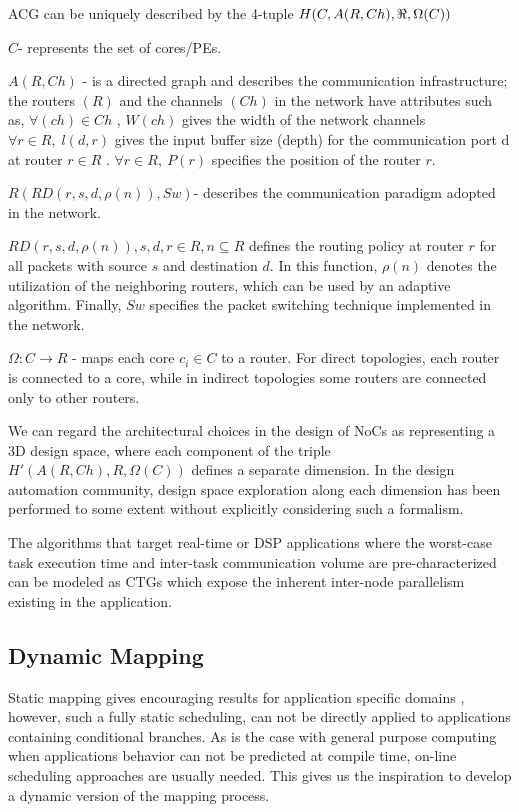 ACG can be uniquely described by the 4-tuple $\text{\ensuremath{H}}(C,A(R,Ch),\Re,\Omega(C))$

$C$- represents the set of cores/PEs.

$A(R,Ch)$ - is a directed graph and describes the communication infrastructure;
the routers $(R)$ and the channels $(Ch)$ in the network have attributes
such as, $\forall(ch)\in Ch$ , $W(ch)$ gives the width of the network
channels $\forall r\in R,\; l(d,r)$ gives the input buffer size (depth)
for the communication port d at router $r\in R$ . $\forall r\in R,\: P(r)$
specifies the position of the router $r$. 

$R(RD(r,s,d,\rho(n)),Sw)$- describes the communication paradigm adopted
in the network. 

$RD(r,s,d,\rho(n)),s,d,r\in R,n\subseteq R$ defines the routing policy
at router $r$ for all packets with source $s$ and destination $d$.
In this function, $\rho(n)$ denotes the utilization of the neighboring
routers, which can be used by an adaptive algorithm. Finally, $Sw$
specifies the packet switching technique implemented in the network. 

$\Omega:C\rightarrow R$ - maps each core $c_{i}\in C$ to a router.
For direct topologies, each router is connected to a core, while in
indirect topologies some routers are connected only to other routers. 

We can regard the architectural choices in the design of NoCs as representing
a 3D design space, where each component of the triple $H'(A(R,Ch),R,\Omega(C))$
defines a separate dimension. In the design automation community,
design space exploration along each dimension has been performed to
some extent without explicitly considering such a formalism. 

The algorithms that target real-time or DSP applications where the
worst-case task execution time and inter-task communication volume
are pre-characterized can be modeled as CTGs which expose the inherent
inter-node parallelism existing in the application. 


\subsection{Dynamic Mapping}

Static mapping gives encouraging results for application specific
domains , however, such a fully static scheduling, can not be directly
applied to applications containing conditional branches. As is the
case with general purpose computing when applications behavior can
not be predicted at compile time, on-line scheduling approaches are
usually needed. This gives us the inspiration to develop a dynamic
version of the mapping process.

